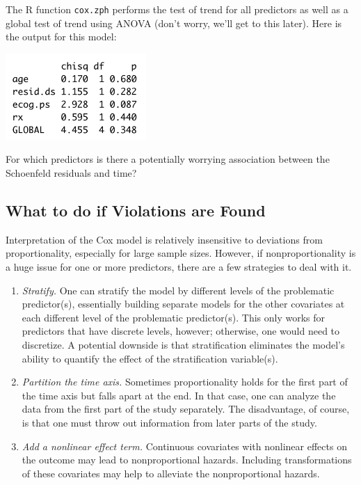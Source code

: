 \begin{question}{}
The R function \texttt{cox.zph} performs the test of trend for all predictors as well as a global test of trend using ANOVA (don't worry, we'll get to this later). Here is the output for this model:
\begin{center}
\includegraphics[width=0.4\textwidth]{img/ovarian-coxzph.png}
\end{center}
For which predictors is there a potentially worrying association between the Schoenfeld residuals and time?
\end{question}

\subsection{What to do if Violations are Found}

Interpretation of the Cox model is relatively insensitive to deviations from proportionality, especially for large sample sizes. However, if nonproportionality is a huge issue for one or more predictors, there are a few strategies to deal with it.

\begin{enumerate}
\item \emph{Stratify.} One can stratify the model by different levels of the problematic predictor(s), essentially building separate models for the other covariates at each different level of the problematic predictor(s). This only works for predictors that have discrete levels, however; otherwise, one would need to discretize. A potential downside is that stratification eliminates the model's ability to quantify the effect of the stratification variable(s).
\item \emph{Partition the time axis.} Sometimes proportionality holds for the first part of the time axis but falls apart at the end. In that case, one can analyze the data from the first part of the study separately. The disadvantage, of course, is that one must throw out information from later parts of the study.
\item \emph{Add a nonlinear effect term.} Continuous covariates with nonlinear effects on the outcome may lead to nonproportional hazards. Including transformations of these covariates may help to alleviate the nonproportional hazards. 
\end{enumerate}

